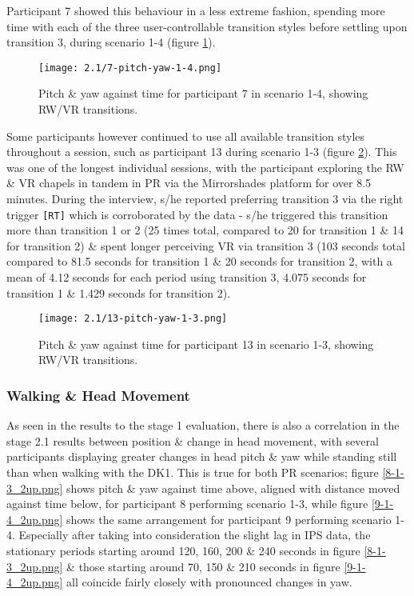 Participant 7 showed this behaviour in a less extreme fashion, spending more time with each of the three user-controllable transition styles before settling upon transition 3, during scenario 1-4 (figure \ref{7-pitch-yaw-1-4.png}).

\begin{figure}[h]
	\begin{center}
	\texttt{[image: 2.1/7-pitch-yaw-1-4.png]}
	\caption{Pitch \& yaw against time for participant 7 in scenario 1-4, showing RW/VR transitions.}
	\label{7-pitch-yaw-1-4.png}
	\end{center}
\end{figure}

Some participants however continued to use all available transition styles throughout a session, such as participant 13 during scenario 1-3 (figure \ref{13-pitch-yaw-1-3.png}). This was one of the longest individual sessions, with the participant exploring the RW \& VR chapels in tandem in PR via the Mirrorshades platform for over 8.5 minutes. During the interview, s/he reported preferring transition 3 via the right trigger \texttt{[RT]} which is corroborated by the data - s/he triggered this transition more than transition 1 or 2 (25 times total, compared to 20 for transition 1 \& 14 for transition 2) \& spent longer perceiving VR via transition 3 (103 seconds total compared to 81.5 seconds for transition 1 \& 20 seconds for transition 2, with a mean of 4.12 seconds for each period using transition 3, 4.075 seconds for transition 1 \& 1.429 seconds for transition 2).

\begin{figure}[h]
	\begin{center}
	\texttt{[image: 2.1/13-pitch-yaw-1-3.png]}
	\caption{Pitch \& yaw against time for participant 13 in scenario 1-3, showing RW/VR transitions.}
	\label{13-pitch-yaw-1-3.png}
	\end{center}
\end{figure}


\subsubsection{Walking \& Head Movement}

As seen in the results to the stage 1 evaluation, there is also a correlation in the stage 2.1 results between position \& change in head movement, with several participants displaying greater changes in head pitch \& yaw while standing still than when walking with the DK1. This is true for both PR scenarios; figure \ref{8-1-3_2up.png} shows pitch \& yaw against time above, aligned with distance moved against time below, for participant 8 performing scenario 1-3, while figure \ref{9-1-4_2up.png} shows the same arrangement for participant 9 performing scenario 1-4. Especially after taking into consideration the slight lag in IPS data, the stationary periods starting around 120, 160, 200 \& 240 seconds in figure \ref{8-1-3_2up.png} \& those starting around 70, 150 \& 210 seconds in figure \ref{9-1-4_2up.png} all coincide fairly closely with pronounced changes in yaw.

